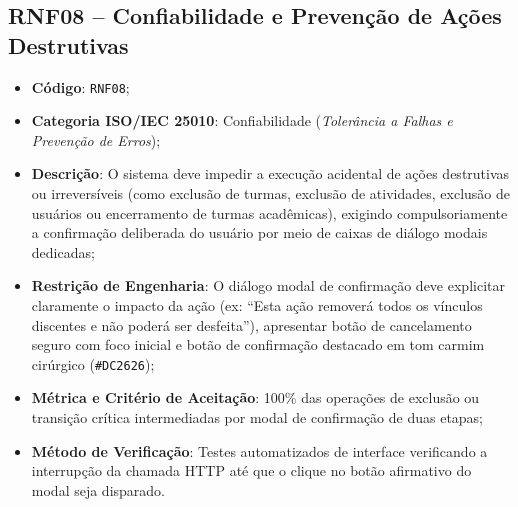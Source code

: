\subsection{RNF08 -- Confiabilidade e Prevenção de Ações Destrutivas}
\begin{itemize}
    \item \textbf{Código}: \texttt{RNF08};
    \item \textbf{Categoria ISO/IEC 25010}: Confiabilidade (\textit{Tolerância a Falhas e Prevenção de Erros});
    \item \textbf{Descrição}: O sistema deve impedir a execução acidental de ações destrutivas ou irreversíveis (como exclusão de turmas, exclusão de atividades, exclusão de usuários ou encerramento de turmas acadêmicas), exigindo compulsoriamente a confirmação deliberada do usuário por meio de caixas de diálogo modais dedicadas;
    \item \textbf{Restrição de Engenharia}: O diálogo modal de confirmação deve explicitar claramente o impacto da ação (ex: ``Esta ação removerá todos os vínculos discentes e não poderá ser desfeita''), apresentar botão de cancelamento seguro com foco inicial e botão de confirmação destacado em tom carmim cirúrgico (\texttt{\#DC2626});
    \item \textbf{Métrica e Critério de Aceitação}: 100\% das operações de exclusão ou transição crítica intermediadas por modal de confirmação de duas etapas;
    \item \textbf{Método de Verificação}: Testes automatizados de interface verificando a interrupção da chamada HTTP até que o clique no botão afirmativo do modal seja disparado.
\end{itemize}

